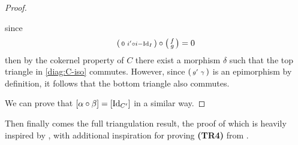 \begin{proof}
\begin{diagramlabel}[\label{diag:C-iso}]
    \end{diagramlabel}
    since
    \[
        \begin{psmallmatrix}
            0 & i' \circ i - \operatorname{Id}_I
        \end{psmallmatrix}
        \circ
        \begin{psmallmatrix}
            f \\
            g
        \end{psmallmatrix}
        = 0
    \]
    then by the cokernel property of \( C \) there exist a morphism \( \delta \) such that the top triangle in \autoref{diag:C-iso} commutes. However, since \( 
        \begin{psmallmatrix}
            g' & \gamma
        \end{psmallmatrix}
    \) is an epimorphism by definition, it follows that the bottom triangle also commutes.

    We can prove that \( [\alpha \circ \beta] = [\operatorname{Id}_{C'}] \) in a similar way.
\end{proof}

Then finally comes the full triangulation result, the proof of which is heavily inspired by \cite[First theorem in Chapter 1, Subsection 2.6]{Happel_1988}, with additional inspiration for proving {\bf (TR4)} from \cite[Theorem 4.18]{Johan_Bachelor}.


